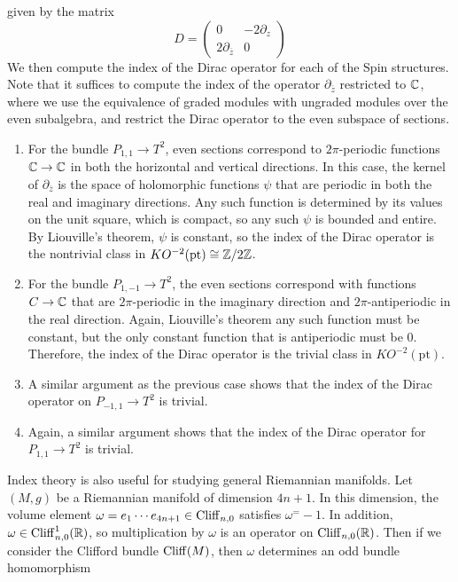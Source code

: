 \begin{exmp}
given by the matrix
\[
D = \begin{pmatrix}
0 & -2\partial_z \\
2\partial_{\overline{z}} & 0
\end{pmatrix}
\]
We then compute the index of the Dirac operator for each of the Spin structures.
Note that it suffices to compute the index of the operator $\partial_{\overline{z}}$
restricted to $\mathbb{C}$, where we use the equivalence of graded modules with ungraded modules
over the even subalgebra, and restrict the Dirac operator to the even subspace
of sections.
\begin{enumerate}
  \item For the bundle $P_{1,1} \to T^2$, even sections correspond to $2\pi$-periodic
  functions $\mathbb{C} \to \mathbb{C}$ in both the horizontal and vertical directions. In this case,
  the kernel of $\partial_{\overline{z}}$ is the space of holomorphic functions
  $\psi$ that are periodic in both the real and imaginary directions. Any such function
  is determined by its values on the unit square, which is compact, so any such
  $\psi$ is bounded and entire. By Liouville's theorem, $\psi$ is constant, so
  the index of the Dirac operator is the nontrivial class in
  $KO^{-2}(\mathrm{pt}) \cong \mathbb{Z}/2\mathbb{Z}$.
  \item For the bundle $P_{1,-1} \to T^2$, the even sections correspond with
  functions $C\to \mathbb{C}$ that are $2\pi$-periodic in the imaginary direction and
  $2\pi$-antiperiodic in the real direction. Again, Liouville's theorem any such
  function must be constant, but the only constant function that is antiperiodic
  must be $0$. Therefore, the index of the Dirac operator is the trivial class
  in $KO^{-2}(\mathrm{pt})$.
  \item A similar argument as the previous case shows that the index of the Dirac
  operator on $P_{-1,1} \to T^2$ is trivial.
  \item Again, a similar argument shows that the index of the Dirac operator
  for $P_{1,1} \to T^2$ is trivial.
\qedhere\end{enumerate}
\end{exmp}
%
Index theory is also useful for studying general Riemannian manifolds. Let
$(M,g)$ be a Riemannian manifold of dimension $4n + 1$. In this dimension, the
volume element $\omega = e_1\cdots e_{4n+1} \in \operatorname{Cliff}_{n,0}$ satisfies $\omega^ = -1$.
In addition, $\omega \in \operatorname{Cliff}_{n,0}^1(\mathbb{R})$, so multiplication by $\omega$ is an
operator on $\operatorname{Cliff}_{n,0}(\mathbb{R})$. Then if we consider the Clifford bundle
$\operatorname{Cliff}(M)$, then $\omega$ determines an odd bundle homomorphism
